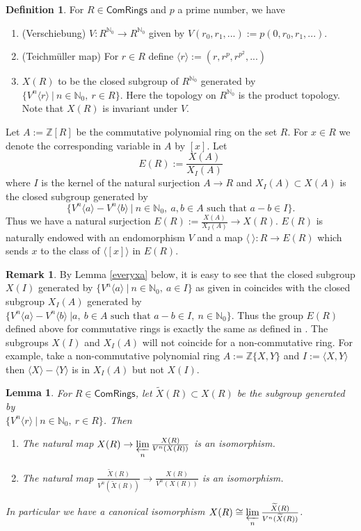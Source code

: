 \documentclass[10pt]{amsart}
\theoremstyle{plain}
\newtheorem{lemma}[thm]{Lemma}
\theoremstyle{definition}
\newtheorem{remark}[thm]{Remark}
\newtheorem{definition}[thm]{Definition}
\newcommand{\ilim}{\mathop{\varprojlim}\limits} %
\renewcommand{\tilde}{\widetilde}
\newcommand{\N}{{\mathbb N}}
\newcommand{\Z}{{\mathbb Z}}
\newcommand{\ab}[1]{\langle {#1} \rangle}
\newcommand{\ac}[1]{\{#1\}}
\newcommand{\Com}{{\mathsf{ComRings}}}
\begin{document}
\begin{definition}\cite[Prop. 1.2]{cd}
\label{commxa} 
For $R \in \Com$ and $p$ a prime number, we have
\begin{enumerate}
\item (Verschiebung) $V: R^{\N_0}\to R^{\N_0}$ given by 
$ V(r_0,r_1,...) := p(0, r_0,r_1,...)$.
\item (Teichm\"{u}ller map) For $r\in R$ define 
$ \ab{r}:= (r,r^p,r^{p^2},...)$
\item $X(R)$ to be the closed subgroup of $R^{\N_0}$ generated by $\{V^n\ab{r} \ | \ n\in \N_0, \ r\in R\}$. Here the topology on $R^{\N_0}$ is the product topology. Note that $X(R)$ is invariant under $V$. 
\end{enumerate}

\noindent \label{commea} Let $A:=\Z [R]$ be the commutative polynomial ring on the set $R$. For $x \in R$ we denote the corresponding variable in $A$ by $[x]$. Let $$E(R):= \frac{X(A)}{X_I(A)}$$ where $I$ is the kernel of the natural surjection $A\to R$ and  $X_I(A) \subset X(A)$ is the closed subgroup generated by $$\{V^n\ab{a} - V^n\ab{b} \ | \ n \in \N_0,\ a, b \in A \text{ such that }a-b\in  I\}.$$
Thus we have a natural surjection $E(R):= \frac{X(A)}{X_I(A)} \to X(R)$.
\noindent $E(R)$ is naturally endowed with an endomorphism $V$ and a map $\ab{ \ } :R \to E(R)$ which sends $x$ to the class of $\ab{[x]}$ in $E(R)$. 
\end{definition}

\begin{remark}\label{rem:xi}
By Lemma \ref{everyxa} below, it is easy to see that the closed subgroup $X(I)$ generated by $\{V^n\ab{a} \ | \ n \in \N_0,  \ a\in  I\}$ as given in \cite[Prop.1.2]{cd} coincides with the closed subgroup $X_I(A)$ generated by 
$\{V^n\ab{a}-V^n\ab{b} \ |a,\ b \in A \text{ such that } a-b\in  I, \ n \in \N_0\}$. Thus the group $E(R)$ defined above for commutative rings is exactly the same as defined in \cite{cd}.
The subgroups $X(I)$ and $X_I(A)$ will not coincide for a non-commutative ring. For example, take a non-commutative polynomial ring $A:= \Z\{X, Y\}$ and $I:=\ab{X, Y} $ then $\ab{X} - \ab{Y}$ is in $X_I(A)$ but not $X(I)$. 
\end{remark}

\begin{lemma}\label{ilimxa} 
For $R \in \Com$, let $\tilde{X}(R)\subset X(R)$ be the subgroup generated by \\
$\ac{V^n\ab{r} \ | \ n\in \N_0, \ r\in R}$. Then 
\begin{enumerate}
\item The natural map $X(R) \to \ilim_n \frac{X(R)}{V^n(X(R))}$ is an isomorphism. 
\item The natural map $\frac{\tilde{X}(R)}{V^n(\tilde{X}(R))} \to \frac{X(R)}{V^n(X(R))}$ is an isomorphism.
\end{enumerate}
In particular we have a canonical isomorphism 
$X(R) \cong \ilim_n\frac{\tilde{X}(R)}{V^n(\tilde{X}(R))}$.
\end{lemma}
\end{document}
